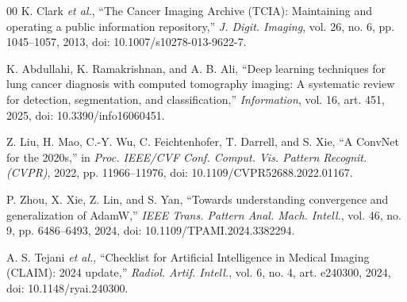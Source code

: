 \documentclass[conference]{IEEEtran}
\begin{document}
\begin{thebibliography}{00}
 K. Clark \emph{et al.}, ``The Cancer Imaging Archive (TCIA): Maintaining and operating a public information repository,'' \textit{J. Digit. Imaging}, vol. 26, no. 6, pp. 1045--1057, 2013, doi: 10.1007/s10278-013-9622-7.

 K. Abdullahi, K. Ramakrishnan, and A. B. Ali, ``Deep learning techniques for lung cancer diagnosis with computed tomography imaging: A systematic review for detection, segmentation, and classification,'' \textit{Information}, vol. 16, art. 451, 2025, doi: 10.3390/info16060451.

 Z. Liu, H. Mao, C.-Y. Wu, C. Feichtenhofer, T. Darrell, and S. Xie, ``A ConvNet for the 2020s,'' in \textit{Proc. IEEE/CVF Conf. Comput. Vis. Pattern Recognit. (CVPR)}, 2022, pp. 11966--11976, doi: 10.1109/CVPR52688.2022.01167.

 P. Zhou, X. Xie, Z. Lin, and S. Yan, ``Towards understanding convergence and generalization of AdamW,'' \textit{IEEE Trans. Pattern Anal. Mach. Intell.}, vol. 46, no. 9, pp. 6486--6493, 2024, doi: 10.1109/TPAMI.2024.3382294.

 A. S. Tejani \emph{et al.}, ``Checklist for Artificial Intelligence in Medical Imaging (CLAIM): 2024 update,'' \textit{Radiol. Artif. Intell.}, vol. 6, no. 4, art. e240300, 2024, doi: 10.1148/ryai.240300.

\end{thebibliography}
\end{document}
